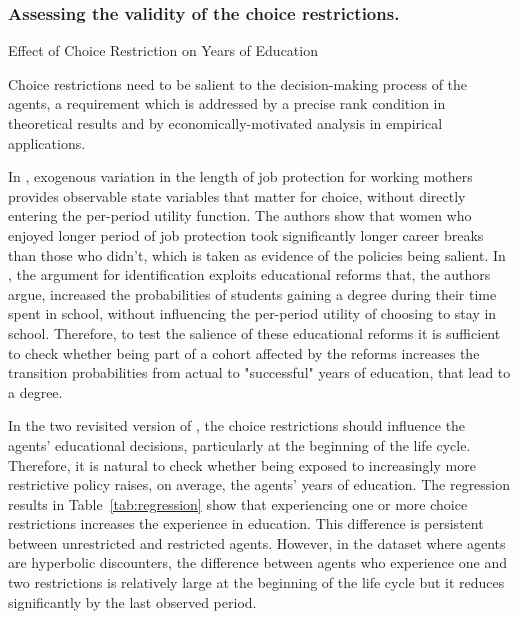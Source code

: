\subsubsection{Assessing the validity of the choice restrictions.}

\begin{table}[t]
\centering
\caption{Effect of Choice Restriction on Years of Education} \label{tab:regression}
\begin{adjustbox}{max width=\textwidth}

\end{adjustbox}
\end{table}

Choice restrictions need to be salient to the decision-making process of the agents, a requirement which is addressed by a precise rank condition in theoretical results and by economically-motivated analysis in empirical applications. 

In \textcite{Haan2020}, exogenous variation in the length of job protection for working mothers provides observable state variables that matter for choice, without directly entering the per-period utility function. The authors show that women who enjoyed longer period of job protection took significantly longer career breaks than those who didn't, which is taken as evidence of the policies being salient. In \textcite{KempterTolan2018}, the argument for identification exploits educational reforms that, the authors argue, increased the probabilities of students gaining a degree during their time spent in school, without influencing the per-period utility of choosing to stay in school. Therefore, to test the salience of these educational reforms it is sufficient to check whether being part of a cohort affected by the reforms increases the transition probabilities from actual to "successful" years of education, that lead to a degree. 

In the two revisited version of \textcite{KeaneWolpin1994}, the choice restrictions should influence the agents' educational decisions, particularly at the beginning of the life cycle. Therefore, it is natural to check whether being exposed to increasingly more restrictive policy raises, on average, the agents' years of education. The regression results in Table~\ref{tab:regression} show that experiencing one or more choice restrictions increases the experience in education. This difference is persistent between unrestricted and restricted agents. However, in the dataset where agents are hyperbolic discounters, the difference between agents who experience one and two restrictions is relatively large at the beginning of the life cycle but it reduces significantly by the last observed period. 



